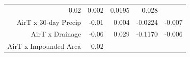 \documentclass[]{article}
\begin{document}
\begin{longtable}[]{@{}rrrrr@{}}
\begin{minipage}[t]{0.08\columnwidth}
0.02\strut
\end{minipage} & \begin{minipage}[t]{0.07\columnwidth}\raggedleft\strut
0.002\strut
\end{minipage} & \begin{minipage}[t]{0.10\columnwidth}\raggedleft\strut
0.0195\strut
\end{minipage} & \begin{minipage}[t]{0.10\columnwidth}\raggedleft\strut
0.028\strut
\end{minipage}\tabularnewline
\begin{minipage}[t]{0.37\columnwidth}\raggedleft\strut
AirT x 30-day Precip\strut
\end{minipage} & \begin{minipage}[t]{0.08\columnwidth}\raggedleft\strut
-0.01\strut
\end{minipage} & \begin{minipage}[t]{0.07\columnwidth}\raggedleft\strut
0.004\strut
\end{minipage} & \begin{minipage}[t]{0.10\columnwidth}\raggedleft\strut
-0.0224\strut
\end{minipage} & \begin{minipage}[t]{0.10\columnwidth}\raggedleft\strut
-0.007\strut
\end{minipage}\tabularnewline
\begin{minipage}[t]{0.37\columnwidth}\raggedleft\strut
AirT x Drainage\strut
\end{minipage} & \begin{minipage}[t]{0.08\columnwidth}\raggedleft\strut
-0.06\strut
\end{minipage} & \begin{minipage}[t]{0.07\columnwidth}\raggedleft\strut
0.029\strut
\end{minipage} & \begin{minipage}[t]{0.10\columnwidth}\raggedleft\strut
-0.1170\strut
\end{minipage} & \begin{minipage}[t]{0.10\columnwidth}\raggedleft\strut
-0.006\strut
\end{minipage}\tabularnewline
\begin{minipage}[t]{0.37\columnwidth}\raggedleft\strut
AirT x Impounded Area\strut
\end{minipage} & \begin{minipage}[t]{0.08\columnwidth}\raggedleft\strut
0.02\strut
\end{minipage} & \begin{minipage}[t]{0.07\columnwidth}\raggedleft\strut

\end{minipage}
\end{longtable}
\end{document}
